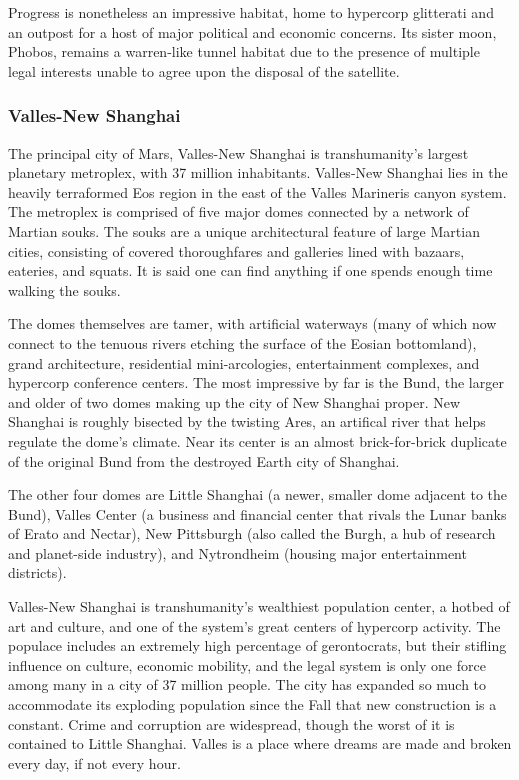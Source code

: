 Progress is nonetheless an impressive habitat, home 
to hypercorp glitterati and an outpost for a host of 
major political and economic concerns. Its sister 
moon, Phobos, remains a warren-like tunnel habitat 
due to the presence of multiple legal interests unable 
to agree upon the disposal of the satellite.

\subsubsection{Valles-New Shanghai}

The principal city of Mars, Valles-New Shanghai is 
transhumanity's largest planetary metroplex, with 37 
million inhabitants. Valles-New Shanghai lies in the 
heavily terraformed Eos region in the east of the Valles 
Marineris canyon system. The metroplex is comprised 
of five major domes connected by a network of 
Martian souks. The souks are a unique architectural 
feature of large Martian cities, consisting of covered 
thoroughfares and galleries lined with bazaars, eateries, and squats. It is said one can find anything if one 
spends enough time walking the souks.

The domes themselves are tamer, with artificial 
waterways (many of which now connect to the tenuous rivers etching the surface of the Eosian bottomland), grand architecture, residential mini-arcologies, 
entertainment complexes, and hypercorp conference 
centers. The most impressive by far is the Bund, the 
larger and older of two domes making up the city 
of New Shanghai proper. New Shanghai is roughly 
bisected by the twisting Ares, an artifical river that 
helps regulate the dome's climate. Near its center is an 
almost brick-for-brick duplicate of the original Bund 
from the destroyed Earth city of Shanghai.

The other four domes are Little Shanghai (a newer, 
smaller dome adjacent to the Bund), Valles Center 
(a business and financial center that rivals the Lunar 
banks of Erato and Nectar), New Pittsburgh (also 
called the Burgh, a hub of research and planet-side 
industry), and Nytrondheim (housing major entertainment districts).

Valles-New Shanghai is transhumanity's wealthiest 
population center, a hotbed of art and culture, and 
one of the system's great centers of hypercorp activity. 
The populace includes an extremely high percentage of gerontocrats, but their stifling  influence  on 
culture, economic mobility, and the legal system is 
only one force among many in a city of 37 million 
people. The city has expanded so much to accommodate its exploding population since the Fall that 
new construction is a constant. Crime and corruption 
are widespread, though the worst of it is contained 
to Little Shanghai. Valles is a place where dreams are 
made and broken every day, if not every hour.

